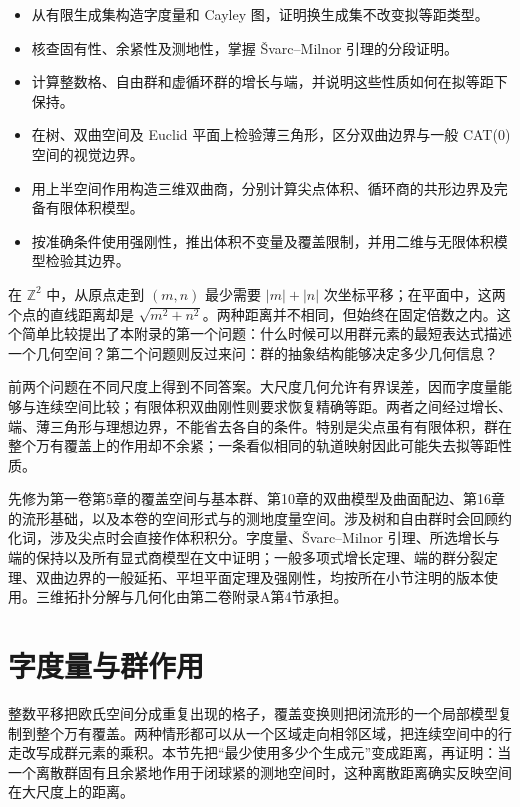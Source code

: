 \begin{learninggoals}
	\begin{itemize}
		\item 从有限生成集构造字度量和 Cayley 图，证明换生成集不改变拟等距类型。
		\item 核查固有性、余紧性及测地性，掌握 Švarc--Milnor 引理的分段证明。
		\item 计算整数格、自由群和虚循环群的增长与端，并说明这些性质如何在拟等距下保持。
		\item 在树、双曲空间及 Euclid 平面上检验薄三角形，区分双曲边界与一般 CAT(0) 空间的视觉边界。
		\item 用上半空间作用构造三维双曲商，分别计算尖点体积、循环商的共形边界及完备有限体积模型。
		\item 按准确条件使用强刚性，推出体积不变量及覆盖限制，并用二维与无限体积模型检验其边界。
	\end{itemize}
\end{learninggoals}

在 \(\mathbb Z^2\) 中，从原点走到 \((m,n)\) 最少需要 \(|m|+|n|\) 次坐标平移；在平面中，这两个点的直线距离却是 \(\sqrt{m^2+n^2}\)。两种距离并不相同，但始终在固定倍数之内。这个简单比较提出了本附录的第一个问题：什么时候可以用群元素的最短表达式描述一个几何空间？第二个问题则反过来问：群的抽象结构能够决定多少几何信息？

\ProseParagraphBreak
前两个问题在不同尺度上得到不同答案。大尺度几何允许有界误差，因而字度量能够与连续空间比较；有限体积双曲刚性则要求恢复精确等距。两者之间经过增长、端、薄三角形与理想边界，不能省去各自的条件。特别是尖点虽有有限体积，群在整个万有覆盖上的作用却不余紧；一条看似相同的轨道映射因此可能失去拟等距性质。

\ProseParagraphBreak
先修为第一卷第5章的覆盖空间与基本群、第10章的双曲模型及曲面配边、第16章的流形基础，以及本卷的空间形式与的测地度量空间。涉及树和自由群时会回顾约化词，涉及尖点时会直接作体积积分。字度量、Švarc--Milnor 引理、所选增长与端的保持以及所有显式商模型在文中证明；一般多项式增长定理、端的群分裂定理、双曲边界的一般延拓、平坦平面定理及强刚性，均按所在小节注明的版本使用。三维拓扑分解与几何化由第二卷附录A第4节承担。

\section{字度量与群作用}
\label{g3:sec:D01}

整数平移把欧氏空间分成重复出现的格子，覆盖变换则把闭流形的一个局部模型复制到整个万有覆盖。两种情形都可以从一个区域走向相邻区域，把连续空间中的行走改写成群元素的乘积。本节先把“最少使用多少个生成元”变成距离，再证明：当一个离散群固有且余紧地作用于闭球紧的测地空间时，这种离散距离确实反映空间在大尺度上的距离。


